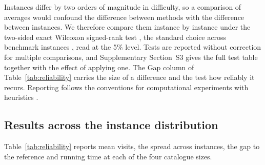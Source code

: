 \documentclass[]{interact}
\begin{document}
Instances differ by two orders of magnitude in difficulty, so a comparison of averages would confound the difference between methods with the difference between instances. We therefore compare them instance by instance under the two-sided exact Wilcoxon signed-rank test \citep{wilcoxon1945}, the standard choice across benchmark instances \citep{demsar2006}, read at the 5\% level. Tests are reported without correction for multiple comparisons, and Supplementary Section~S3 gives the full test table together with the effect of applying one. The Gap column of Table~\ref{tab:reliability} carries the size of a difference and the test how reliably it recurs. Reporting follows the conventions for computational experiments with heuristics \citep{barr1995designing, hooker1995testing}.



\subsection{Results across the instance distribution}\label{sec:reliability}
Table~\ref{tab:reliability} reports mean visits, the spread across instances, the gap to the reference and running time at each of the four catalogue sizes.
\end{document}
